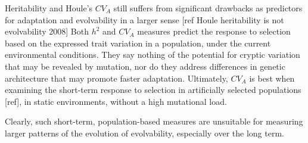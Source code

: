 Heritability and Houle’s $CV_A$ still suffers from significant drawbacks as predictors for adaptation and evolvability in a larger sense [ref Houle heritability is not evolvability 2008] Both $h^2$ and $CV_A$ measures predict the response to selection based on the expressed trait variation in a population, under the current environmental conditions. They say nothing of the potential for cryptic variation that may be revealed by mutation, nor do they address differences in genetic architecture that may promote faster adaptation. Ultimately, $CV_A$ is best when examining the short-term response to selection in artificially selected populations [ref], in static environments, without a high mutational load.

Clearly, such short-term, population-based measures are unsuitable for measuring larger patterns of the evolution of evolvability, especially over the long term.

